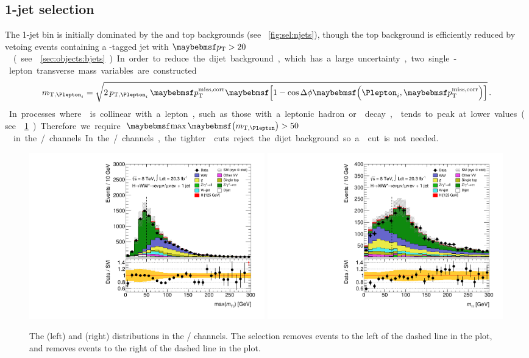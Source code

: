 \subsection{1-jet selection}
\label{sec:selection:1j}

The 1-jet bin is initially dominated by the \DY and top backgrounds (see 
\Figure~\ref{fig:sel:njets}), though the top background is efficiently reduced by vetoing 
events containing a \Pbottom-tagged jet with \unit{$\pt > 20$}{\GeV} (see 
\Section~\ref{sec:objects:bjets}).

In order to reduce the dijet background, which has a large uncertainty, two single-lepton 
transverse mass variables are constructed
\begin{equation}
	m_{\text{T,}\Plepton_i} = \sqrt{2 \, p_{\text{T,}\Plepton_i} \, \corrtrackmet 
	\sqbracs{1 - \cos\Delta\phi\parenths{\Plepton_i, \corrtrackmet}}} \,.
\end{equation}
In processes where \corrtrackmetvec is collinear with a lepton, such as those with a 
leptonic hadron or \Ptau decay, \maxmtw tends to peak at lower values (see 
\Figure~\ref{fig:sel:1j:df_cuts}). Therefore we require \unit{$\maxmtw > 50$}{\GeV} in the 
\emch/\mech channels. In the \eech/\mmch channels, the tighter \met cuts reject the dijet 
background so a \maxmtw cut is not needed.

\begin{figure}[t]
	\includegraphics[width=0.495\textwidth]{tex/selection/emme_CutbVeto_1jet_MaxMTW_TrackHWW_Clj_mh125_lin}
	\hfill
	\includegraphics[width=0.495\textwidth]{tex/selection/emme_CutMaxMTlep_1jet_Mtt_TrackHWW_Clj_mh125_lin}
	\caption{The \maxmtw (left) and \mtautau (right) distributions in the \emch/\mech 
	channels. The selection removes events to the left of the dashed line in the \maxmtw 
	plot, and removes events to the right of the dashed line in the \mtautau plot.}
	\label{fig:sel:1j:df_cuts}
\end{figure}

